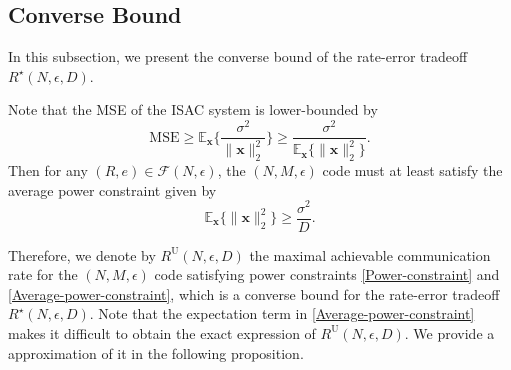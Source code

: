 \documentclass[conference,a4paper]{IEEEtran}
\begin{document}
\subsection{Converse Bound}
In this subsection, we present the converse bound of the rate-error tradeoff $R^\star(N,\epsilon,D)$. 


Note that the MSE of the ISAC system is lower-bounded by
\begin{equation}
    \mathrm{MSE}\geq \mathbb{E}_{\mathbf{x}}\bigg\{\frac{\sigma^2}{\|\mathbf{x}\|_2^2}\bigg\} \geq \frac{\sigma^2}{\mathbb{E}_{\mathbf{x}}\{\|\mathbf{x}\|_2^2\}}.
\end{equation}
Then for any $(R,e)\in \mathcal{F}(N,\epsilon)$, the $(N,M,\epsilon)$ code must at least satisfy the average power constraint given by
\begin{equation}
\label{Average-power-constraint}
\mathbb{E}_{\mathbf{x}}\{\|\mathbf{x}\|_2^2\} \geq \frac{\sigma^2}{D}.
\end{equation}

Therefore, we denote by $R^\mathrm{U}(N,\epsilon,D)$ the maximal achievable communication rate for the $(N,M,\epsilon)$ code satisfying power constraints \eqref{Power-constraint} and \eqref{Average-power-constraint}, which is a converse bound for the rate-error tradeoff $R^\star(N,\epsilon,D)$. Note that the expectation term in \eqref{Average-power-constraint} makes it difficult to obtain the exact expression of $R^\mathrm{U}(N,\epsilon,D)$. We provide a approximation of it in the following proposition.
\end{document}
